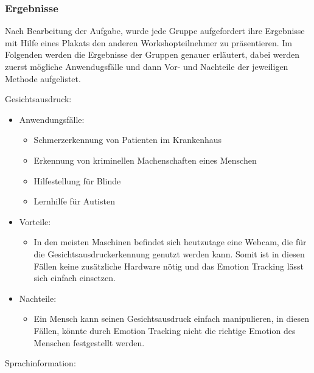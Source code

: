 \subsubsection*{Ergebnisse}\label{Umsetzung_Anwendungsfaelle_Ergebnisse}
Nach Bearbeitung der Aufgabe, wurde jede Gruppe aufgefordert ihre Ergebnisse mit Hilfe eines Plakats den anderen Workshopteilnehmer zu präsentieren. Im Folgenden werden die Ergebnisse der Gruppen genauer erläutert, dabei werden zuerst mögliche Anwendugsfälle und dann Vor- und Nachteile der jeweiligen Methode aufgelistet.\newline

\noindent Gesichtsausdruck:
\begin{itemize}
	\item Anwendungsfälle:
	\begin{itemize}
		\item Schmerzerkennung von Patienten im Krankenhaus
		\item Erkennung von kriminellen Machenschaften eines Menschen
		\item Hilfestellung für Blinde
		\item Lernhilfe für Autisten
	\end{itemize}
	\item Vorteile:
	\begin{itemize}
		\item In den meisten Maschinen befindet sich heutzutage eine Webcam, die für die Gesichtsausdruckerkennung genutzt werden kann. Somit ist in diesen Fällen keine zusätzliche Hardware nötig und das Emotion Tracking lässt sich einfach einsetzen.		 
	\end{itemize}
	\item Nachteile:
	\begin{itemize}
		\item Ein Mensch kann seinen Gesichtsausdruck einfach manipulieren, in diesen Fällen, könnte durch Emotion Tracking nicht die richtige Emotion des Menschen festgestellt werden.
	\end{itemize}
\end{itemize}
\vspace{2mm}
Sprachinformation: 
